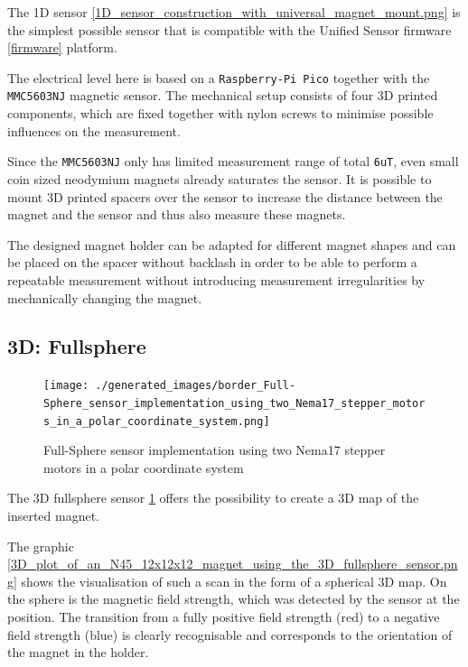 The 1D sensor
\ref{1D_sensor_construction_with_universal_magnet_mount.png} is the
simplest possible sensor that is compatible with the Unified Sensor
firmware \ref{firmware} platform.

The electrical level here is based on a
\passthrough{\lstinline!Raspberry-Pi Pico!} together with the
\passthrough{\lstinline!MMC5603NJ!} magnetic sensor. The mechanical
setup consists of four 3D printed components, which are fixed together
with nylon screws to minimise possible influences on the measurement.

Since the \passthrough{\lstinline!MMC5603NJ!} only has limited
measurement range of total \passthrough{\lstinline!6uT!}, even small
coin sized neodymium magnets already saturates the sensor. It is
possible to mount 3D printed spacers over the sensor to increase the
distance between the magnet and the sensor and thus also measure these
magnets.

The designed magnet holder can be adapted for different magnet shapes
and can be placed on the spacer without backlash in order to be able to
perform a repeatable measurement without introducing measurement
irregularities by mechanically changing the magnet.

\hypertarget{d-fullsphere}{%
\subsection{3D: Fullsphere}\label{d-fullsphere}}

\begin{figure}
\centering
\texttt{[image: ./generated\_images/border\_Full-Sphere\_sensor\_implementation\_using\_two\_Nema17\_stepper\_motors\_in\_a\_polar\_coordinate\_system.png]}
\caption{Full-Sphere sensor implementation using two Nema17 stepper
motors in a polar coordinate system
\label{Full-Sphere_sensor_implementation_using_two_Nema17_stepper_motors_in_a_polar_coordinate_system.png}}
\end{figure}

The 3D fullsphere sensor
\ref{Full-Sphere_sensor_implementation_using_two_Nema17_stepper_motors_in_a_polar_coordinate_system.png}
offers the possibility to create a 3D map of the inserted magnet.

The graphic
\ref{3D_plot_of_an_N45_12x12x12_magnet_using_the_3D_fullsphere_sensor.png}
shows the visualisation of such a scan in the form of a spherical 3D
map. On the sphere is the magnetic field strength, which was detected by
the sensor at the position. The transition from a fully positive field
strength (red) to a negative field strength (blue) is clearly
recognisable and corresponds to the orientation of the magnet in the
holder.

